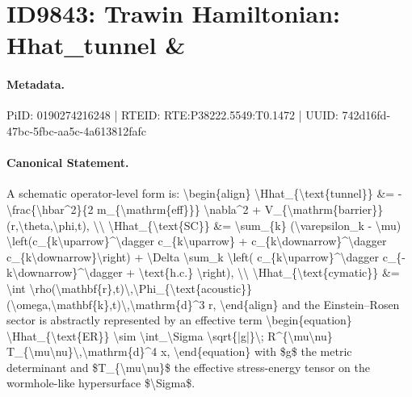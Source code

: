 \section*{ID9843: Trawin Hamiltonian: Hhat\_tunnel \&}
\paragraph{Metadata.}
PiID: 0190274216248 | RTEID: RTE:P38222.5549:T0.1472 | UUID: 742d16fd-47bc-5fbc-aa5c-4a613812fafc

\paragraph{Canonical Statement.}
A schematic operator-level form is: \textbackslash{}begin\{align\} \textbackslash{}Hhat\_\{\textbackslash{}text\{tunnel\}\} \&= -\textbackslash{}frac\{\textbackslash{}hbar\textasciicircum{}2\}\{2 m\_\{\textbackslash{}mathrm\{eff\}\}\} \textbackslash{}nabla\textasciicircum{}2 + V\_\{\textbackslash{}mathrm\{barrier\}\}(r,\textbackslash{}theta,\textbackslash{}phi,t), \textbackslash{}\textbackslash{} \textbackslash{}Hhat\_\{\textbackslash{}text\{SC\}\} \&= \textbackslash{}sum\_\{k\} (\textbackslash{}varepsilon\_k - \textbackslash{}mu) \textbackslash{}left(c\_\{k\textbackslash{}uparrow\}\textasciicircum{}\textbackslash{}dagger c\_\{k\textbackslash{}uparrow\} + c\_\{k\textbackslash{}downarrow\}\textasciicircum{}\textbackslash{}dagger c\_\{k\textbackslash{}downarrow\}\textbackslash{}right) + \textbackslash{}Delta \textbackslash{}sum\_k \textbackslash{}left( c\_\{k\textbackslash{}uparrow\}\textasciicircum{}\textbackslash{}dagger c\_\{-k\textbackslash{}downarrow\}\textasciicircum{}\textbackslash{}dagger + \textbackslash{}text\{h.c.\} \textbackslash{}right), \textbackslash{}\textbackslash{} \textbackslash{}Hhat\_\{\textbackslash{}text\{cymatic\}\} \&= \textbackslash{}int \textbackslash{}rho(\textbackslash{}mathbf\{r\},t)\textbackslash{},\textbackslash{}Phi\_\{\textbackslash{}text\{acoustic\}\}(\textbackslash{}omega,\textbackslash{}mathbf\{k\},t)\textbackslash{},\textbackslash{}mathrm\{d\}\textasciicircum{}3 r, \textbackslash{}end\{align\} and the Einstein--Rosen sector is abstractly represented by an effective term \textbackslash{}begin\{equation\} \textbackslash{}Hhat\_\{\textbackslash{}text\{ER\}\} \textbackslash{}sim \textbackslash{}int\_\textbackslash{}Sigma \textbackslash{}sqrt\{|g|\}\textbackslash{}; R\textasciicircum{}\{\textbackslash{}mu\textbackslash{}nu\} T\_\{\textbackslash{}mu\textbackslash{}nu\}\textbackslash{},\textbackslash{}mathrm\{d\}\textasciicircum{}4 x, \textbackslash{}end\{equation\} with \$g\$ the metric determinant and \$T\_\{\textbackslash{}mu\textbackslash{}nu\}\$ the effective stress-energy tensor on the wormhole-like hypersurface \$\textbackslash{}Sigma\$.

